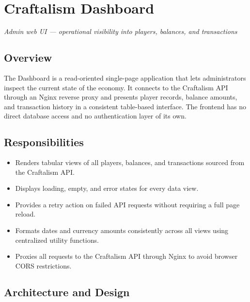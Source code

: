 

\chapter{Craftalism Dashboard}
\label{ch:dashboard}

\textcolor{CraftGray}{\textit{Admin web UI — operational visibility into players, balances, and transactions}}

\bigskip

\section{Overview}

The Dashboard is a read-oriented single-page application that lets administrators inspect the current state of the economy. It connects to the Craftalism API through an Nginx reverse proxy and presents player records, balance amounts, and transaction history in a consistent table-based interface. The frontend has no direct database access and no authentication layer of its own.

\section{Responsibilities}

\begin{itemize}
  \item Renders tabular views of all players, balances, and transactions sourced from the Craftalism API.
  \item Displays loading, empty, and error states for every data view.
  \item Provides a retry action on failed API requests without requiring a full page reload.
  \item Formats dates and currency amounts consistently across all views using centralized utility functions.
  \item Proxies all  requests to the Craftalism API through Nginx to avoid browser CORS restrictions.
\end{itemize}

\section{Architecture and Design}

